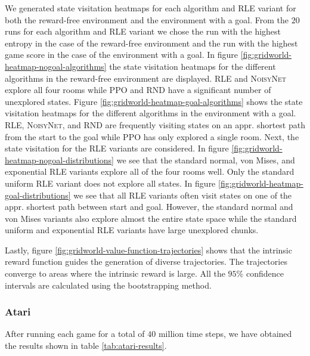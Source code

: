 \documentclass[10pt]{article} %
\begin{document}
We generated state visitation heatmaps for each algorithm and \textsc{RLE} variant for both the reward-free environment and the environment with a goal. From the $20$ runs for each algorithm and \textsc{RLE} variant we chose the run with the highest entropy in the case of the reward-free environment and the run with the highest game score in the case of the environment with a goal. In figure \ref{fig:gridworld-heatmap-nogoal-algorithms} the state visitation heatmaps for the different algorithms in the reward-free environment are displayed. \textsc{RLE} and \textsc{NoisyNet} explore all four rooms while \textsc{PPO} and \textsc{RND} have a significant number of unexplored states. Figure \ref{fig:gridworld-heatmap-goal-algorithms} shows the state visitation heatmaps for the different algorithms in the environment with a goal. \textsc{RLE}, \textsc{NoisyNet}, and \textsc{RND} are frequently visiting states on an appr. shortest path from the start to the goal while \textsc{PPO} has only explored a single room. Next, the state visitation for the \textsc{RLE} variants are considered. In figure \ref{fig:gridworld-heatmap-nogoal-distributions} we see that the standard normal, von Mises, and exponential \textsc{RLE} variants explore all of the four rooms well. Only the standard uniform \textsc{RLE} variant does not explore all states. In figure \ref{fig:gridworld-heatmap-goal-distributions} we see that all \textsc{RLE} variants often visit states on one of the appr. shortest path between start and goal. However, the standard normal and von Mises variants also explore almost the entire state space while the standard uniform and exponential \textsc{RLE} variants have large unexplored chunks.

Lastly, figure \ref{fig:gridworld-value-function-trajectories} shows that the intrinsic reward function guides the generation of diverse trajectories. The trajectories converge to areas where the intrinsic reward is large. All the $95\%$ confidence intervals are calculated using the bootstrapping method. 

\subsubsection{Atari}

After running each game for a total of $40$ million time steps, we have obtained the results shown in table \ref{tab:atari-results}.
\end{document}
